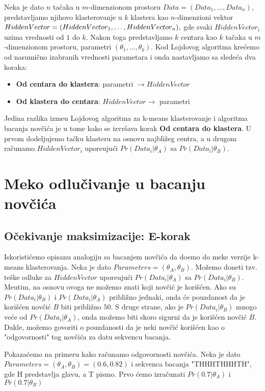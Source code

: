 Neka je dato $n$ tačaka u $m$-dimenzionom prostoru $Data = (Data_1,\dots, Data_n)$, predstavljamo njihovo klasterovanje u $k$ klastera kao $n$-dimenzioni vektor $HiddenVector = (HiddenVector_1,\dots, \\ HiddenVector_n ),$ gde svaki $HiddenVector_i$ uzima vrednosti od $1$ do $k$. Nakon toga predstavljamo $k$ centara kao $k$ tačaka u $m$-dimenzionom prostoru, parametri $(\theta_1,\dots,\theta_k)$. Kod Lojdovog algoritma krećemo od nasumično izabranih vrednosti parametara i onda nastavljamo sa sledeća dva koraka:
\begin{itemize}
    \item \textbf{Od centara do klastera}: parametri $\rightarrow HiddenVector$
    \item \textbf{Od klastera do centara}: $HiddenVector \rightarrow $ parametri 
\end{itemize}

Jedina razlika izme\dj u Lojdovog algoritma za k-means klasterovanje i algoritma bacanja novčića je u tome kako se izvršava korak \textbf{Od centara do klastera}. U prvom dodeljujemo tačku klasteru na osnovu najbližeg centra, a u drugom računamo $HiddenVector_i$ upore\dj ujući $Pr(Data_i|\theta_A)$ sa $Pr(Data_i|\theta_B)$.

\section{Meko odlučivanje u bacanju novčića} %
\subsection{Očekivanje maksimizacije: E-korak}

Iskoristićemo opisanu analogiju sa bacanjem novčića da do\dj emo do meke verzije k-means klasterovanja. Neka je dato $Parameters = (\theta_A, \theta_B)$. Možemo doneti tzv. teške odluke za $HiddenVector$ upore\dj ujući $Pr(Data_i|\theta_A)$ sa $Pr(Data_i|\theta_B)$. Me\dj utim, na osnovu ovoga ne možemo znati koji novčić je korišćen. Ako su $Pr(Data_i|\theta_B)$ i $Pr(Data_i|\theta_A)$ približno jednaki, onda će pouzdanost da je korišćen novčić $B$ biti približno $50$. S druge strane, ako je $Pr(Data_i|\theta_B)$ mnogo veće od $Pr(Data_i|\theta_A)$, onda možemo biti skoro sigurni da je korišćen novčić $B$.
Dakle, možemo govoriti o pouzdanosti da je neki novčić korišćen kao o "odgovornosti" tog novčića za datu sekvencu bacanja. 

Pokazaćemo na primeru kako računamo odgovornosti novčića. Neka je dato $Parameters = (\theta_A, \theta_B) = (0.6, 0.82)$ i sekvenca bacanja "THHHTHHHTH", gde H predstavlja glavu, a T pismo. Prvo ćemo izračunati $Pr(0.7|\theta_A)$ i $Pr(0.7|\theta_B)$
    
